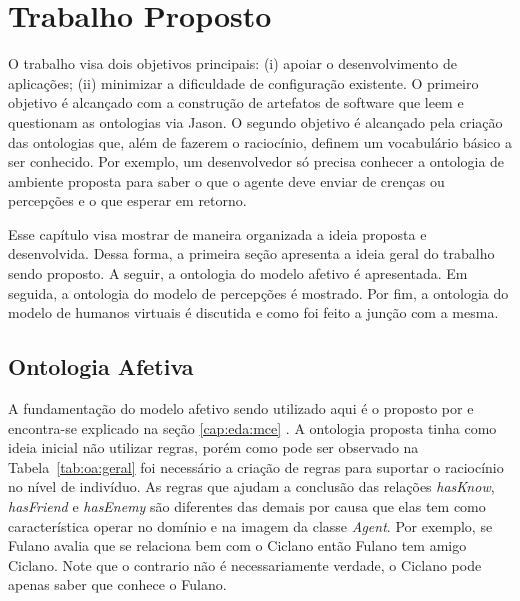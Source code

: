 \chapter{Trabalho Proposto} \label{cap:tp}

O trabalho visa dois objetivos principais: (i) apoiar o desenvolvimento de
aplicações; (ii) minimizar a dificuldade de configuração existente. O primeiro
objetivo é alcançado com a construção de artefatos de software que leem e
questionam as ontologias via Jason. O segundo objetivo é alcançado pela
criação das ontologias que, além de fazerem o raciocínio, definem um
vocabulário básico a ser conhecido. Por exemplo, um desenvolvedor só
precisa conhecer a ontologia de ambiente proposta para saber\dev{} o que o agente
deve enviar de crenças ou percepções e o que esperar em retorno.

Esse capítulo visa mostrar de maneira organizada a ideia proposta e
desenvolvida. Dessa forma, a primeira seção apresenta a ideia geral do
trabalho sendo proposto. A seguir, a ontologia do modelo afetivo é
apresentada. Em seguida, a ontologia do modelo de percepções é mostrado. Por
fim, a ontologia do modelo de humanos virtuais é discutida e como foi feito a
junção com a mesma.

\section{Ontologia Afetiva} \label{cap:tp:oa}

A fundamentação do modelo afetivo sendo utilizado aqui é o proposto por
\citet{ortony1988cse} e encontra-se explicado na seção \ref{cap:eda:mce}
. A ontologia proposta tinha
como ideia inicial não utilizar regras, porém como pode ser observado na
Tabela~\ref{tab:oa:geral} foi necessário a criação de regras para suportar o
raciocínio no nível de indivíduo. As regras que ajudam a conclusão das
relações \emph{hasKnow}, \emph{hasFriend} e \emph{hasEnemy} são diferentes das
demais por causa que elas tem como característica operar no domínio e na
imagem da classe \emph{Agent}. Por exemplo, se Fulano
avalia que se relaciona bem com o Ciclano então Fulano tem amigo Ciclano. Note
que o contrario não é necessariamente verdade, o Ciclano pode apenas saber que
conhece o Fulano.

